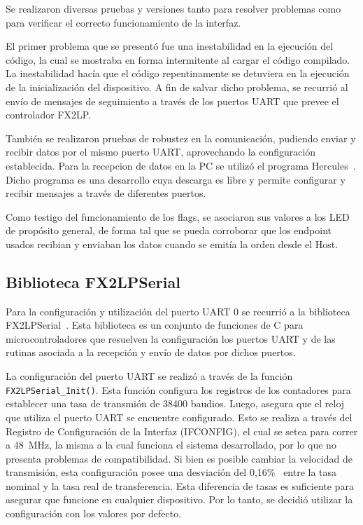 
Se realizaron diversas pruebas y versiones tanto para resolver problemas como para verificar el correcto funcionamiento de la interfaz.

El primer problema que se presentó fue una inestabilidad en la ejecución del código, la cual se mostraba en forma intermitente al cargar el código compilado. La inestabilidad hacía que el código repentinamente se detuviera en la ejecución de la inicialización del dispositivo. A fin de salvar dicho problema, se recurrió al envío de mensajes de seguimiento a través de los puertos UART que prevee el controlador FX2LP.

También se realizaron pruebas de robustez en la comunicación, pudiendo enviar y recibir datos por el mismo puerto UART, aprovechando la configuración establecida. Para la recepcion de datos en la PC se utilizó el programa Hercules~\cite{HWGroup}. Dicho programa es una desarrollo cuya descarga es libre y permite configurar y recibir mensajes a través de diferentes puertos.

Como testigo del funcionamiento de los flags, se asociaron sus valores a los LED de propósito general, de forma tal que se pueda corroborar que los endpoint usados recibian y enviaban los datos cuando se emitía la orden desde el Host.

\subsection{Biblioteca FX2LPSerial}
Para la configuración y utilización del puerto UART 0 se recurrió a la biblioteca FX2LPSerial~\cite{Kumar2017}. Esta biblioteca es un conjunto de funciones de C para microcontroladores que resuelven la configuración los puertos UART y de las rutinas asociada a la recepción y envío de datos por dichos puertos. 

La configuración del puerto UART se realizó a través de la función \verb|FX2LPSerial_Init()|. Esta función configura los registros de los contadores para establecer una tasa de transmión de 38400 baudios. Luego, asegura que el reloj que utiliza el puerto UART se encuentre configurado. Esto se realiza a través del Registro de Configuración de la Interfaz (IFCONFIG), el cual se setea para correr a \SI{48}{\mega\hertz}, la misma a la cual funciona el sistema desarrollado, por lo que no presenta problemas de compatibilidad. Si bien es posible cambiar la velocidad de transmisión, esta configuración posee una desviación del 0,16\%~\cite{CypressSemiconductor2014fx2lp} entre la tasa nominal y la tasa real de transferencia. Esta diferencia de tasas es suficiente para asegurar que funcione en cualquier dispositivo. Por lo tanto, se decidió utilizar la configuración con los valores por defecto.

